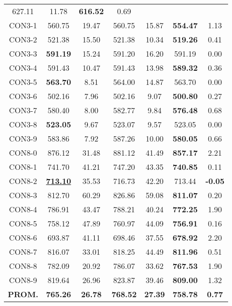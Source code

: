 \begin{table}[ht]
\begin{tabular}{c c c c c c c}
627.11 & 11.78 & \bf{616.52} & 
0.69\\CON3-1 & 560.75 & 19.47 & 
560.75 & 15.87 & \bf{554.47} & 
1.13\\CON3-2 & 521.38 & 15.50 & 
521.38 & 10.34 & \bf{519.26} & 
0.41\\CON3-3 & \bf{591.19} & 15.24 & 
591.20 & 16.20 & 591.19 & 0.00\\
CON3-4 & 591.43 & 10.47 & 
591.43 & 13.98 & \bf{589.32} & 
0.36\\CON3-5 & \bf{563.70} & 8.51 & 
564.00 & 14.87 & 563.70 & 0.00\\
CON3-6 & 502.16 & 7.96 & 
502.16 & 9.07 & \bf{500.80} & 
0.27\\CON3-7 & 580.40 & 8.00 & 
582.77 & 9.84 & \bf{576.48} & 
0.68\\CON3-8 & \bf{523.05} & 9.67 & 
523.07 & 9.57 & 523.05 & 0.00\\
CON3-9 & 583.86 & 7.92 & 
587.26 & 10.00 & \bf{580.05} & 
0.66\\CON8-0 & 876.12 & 31.48 & 
881.12 & 41.49 & \bf{857.17} & 
2.21\\CON8-1 & 741.70 & 41.21 & 
747.20 & 43.35 & \bf{740.85} & 
0.11\\CON8-2 & \bf{\underline{713.10}} & 35.53 & 
716.73 & 42.20 & 713.44 & 
\bf{-0.05}\\CON8-3 & 812.70 & 60.29 & 
826.86 & 59.08 & \bf{811.07} & 
0.20\\CON8-4 & 786.91 & 43.47 & 
788.21 & 40.24 & \bf{772.25} & 
1.90\\CON8-5 & 758.12 & 47.89 & 
760.97 & 44.09 & \bf{756.91} & 
0.16\\CON8-6 & 693.87 & 41.11 & 
698.46 & 37.55 & \bf{678.92} & 
2.20\\CON8-7 & 816.07 & 33.01 & 
818.25 & 44.49 & \bf{811.96} & 
0.51\\CON8-8 & 782.09 & 20.92 & 
786.07 & 33.62 & \bf{767.53} & 
1.90\\CON8-9 & 819.64 & 26.96 & 
823.87 & 39.46 & \bf{809.00} & 
1.32\\\bf{PROM.} & 
\bf{765.26} & \bf{26.78} & \bf{768.52} & \bf{27.39} & \bf{758.78} & \bf{0.77}\\[1ex]\hline
\end{tabular}
\label{table:nonlin}
\end{table} \clearpage
